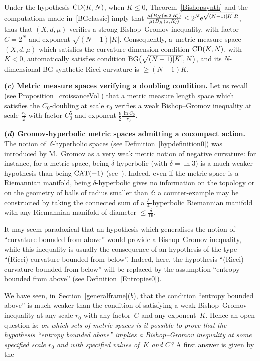 \documentclass[10pt,a4paper]{amsart}
\numberwithin{equation}{section}
\begin{document}
Under the hypothesis ${\rm CD}(K, N)$, when $K\le 0$, Theorem~\ref{Bishopsynth} and the computations made in~\eqref{BGclassic} imply that
$\frac{\mu (B_X(x, 2\,R))}{\mu (B_X(x, R))} \le 2^N{\rm e}^{\sqrt{(N-1) |K|} R}$, thus that $(X,d,\mu)$ verifies a strong Bishop--Gromov inequality, with factor $C = 2^N$ and exponent $ \sqrt{(N-1) |K|}$. Consequently, a~metric measure space $(X,d,\mu)$ which satisfies the curvature-dimension condition
${\rm CD}(K, N)$, with \mbox{$K < 0$}, automatically satisfies condition ${\rm BG}\big(\sqrt{(N-1) |K|},N\big)$, and its $N$-dimensional BG-synthetic Ricci
curvature is $\ge (N-1) K$.

\medskip\noindent
{\bf (\emph{c}) Metric measure spaces verifying a doubling condition.}
Let us recall (see Proposition~\ref{croissanceVol}) that a metric measure
length space which satisfies the $C_0$-doubling at scale $r_0$ verifies
a weak Bishop--Gromov inequality at scale $\frac{r_0}{2}$ with factor $C_0^5$ and exponent $\frac{9}{2} \frac{ \ln C_0}{r_0}$.

\medskip\noindent
{\bf (\emph{d}) Gromov-hyperbolic metric spaces admitting a cocompact action.}
The notion of~$\delta$-hyperbolic spaces (see Definition~\ref{hypdefinition0}) was introduced by M.~Gromov as a very weak metric notion of negative
curvature: for instance, for a metric space, being $\delta$-hyperbolic (with $\delta = \ln 3$) is a much weaker hypothesis than being ${\rm CAT}(-1)$
(see~\cite[Proposition~1.4.3, p.~12]{CDP}).
Indeed, even if the metric
space is a Riemannian manifold, being $\delta$-hyperbolic gives no information on the topology or on the geometry of balls of radius smaller than $\delta$:
a counter-example may be constructed by taking the connected sum of a $\frac{\delta}{4}$-hyperbolic Riemannian manifold with any Riemannian manifold
of diameter $\le \frac{\delta}{16}$.

It may seem paradoxical that an hypothesis which generalises the notion of ``curvature bounded from above'' would provide a Bishop--Gromov inequality,
while this inequality is usually the consequence of an hypothesis of the type ``(Ricci) curvature bounded from below''. Indeed, here, the hypothesis
``(Ricci) curvature bounded from below'' will be replaced by the assumption ``entropy bounded from above'' (see Definition~\ref{Entropies0}).


We have seen, in~Section~\ref{generalframe}($b$), that the condition ``entropy bounded above'' is much weaker than the condition of satisfying a weak Bishop--Gromov inequality at any scale $r_0$ with any factor~$C$ and any exponent~$K$.
Hence an open question is: {\em on which sets of metric spaces is it possible to prove that the
hypothesis ``entropy bounded above'' implies a Bishop--Gromov inequality at some specified scale $r_0$ and with specified values of~$K$ and $C$?}
A first answer is given by the
\end{document}

